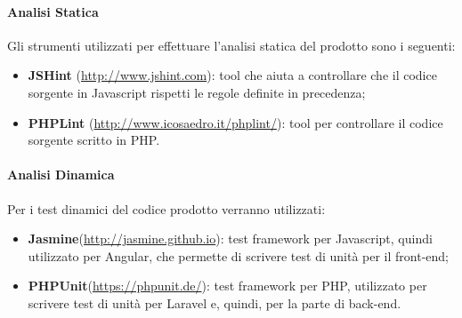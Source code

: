	\paragraph{Analisi Statica}
	Gli strumenti utilizzati per effettuare l'analisi statica del prodotto sono i seguenti:
	\begin{itemize}
		\item \textbf{JSHint} (\url{http://www.jshint.com}): tool che aiuta a controllare che il codice sorgente in \gls{Javascript} rispetti le regole definite in precedenza;
		\item \textbf{PHPLint} (\url{http://www.icosaedro.it/phplint/}): tool per controllare il codice sorgente scritto in \gls{PHP}.
	\end{itemize}
	
	\paragraph{Analisi Dinamica}
	Per i test dinamici del codice prodotto verranno utilizzati:
	\begin{itemize}
		\item \textbf{Jasmine}(\url{http://jasmine.github.io}): test \gls{framework} per \gls{Javascript}, quindi utilizzato per \gls{Angular}, che permette di scrivere test di unità per il \gls{front-end};
		\item \textbf{PHPUnit}(\url{https://phpunit.de/}): test \gls{framework} per \gls{PHP}, utilizzato per scrivere test di unità per Laravel e, quindi, per la parte di \gls{back-end}.
	\end{itemize}
	
